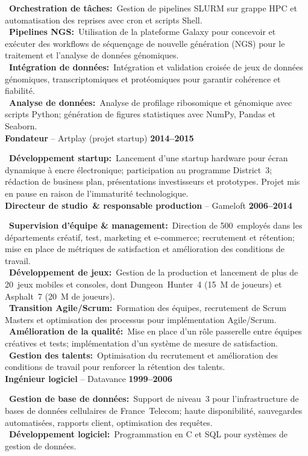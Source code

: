 \documentclass[a4paper,10pt]{article}
\newcommand{\resumeItem}[3]{%
  \noindent\textbf{#1} -- #2 \hfill \textbf{#3} \\
  \vspace{0.3em}
}
\newcommand{\jobItem}[2]{%
  \noindent
  \textbullet\ \textbf{#1\ifthenelse{\boolean{EN}}{}{ }:}~#2\vspace{0.3em} \\
}
\begin{document}
{{    \jobItem{Orchestration de tâches}{Gestion de pipelines SLURM sur grappe HPC et automatisation des reprises avec cron et scripts Shell.}
    \jobItem{Pipelines NGS}{Utilisation de la plateforme Galaxy pour concevoir et exécuter des workflows de séquençage de nouvelle génération (NGS) pour le traitement et l’analyse de données génomiques.}
    \jobItem{Intégration de données}{Intégration et validation croisée de jeux de données génomiques, transcriptomiques et protéomiques pour garantir cohérence et fiabilité.}
    \jobItem{Analyse de données}{Analyse de profilage ribosomique et génomique avec scripts Python; génération de figures statistiques avec NumPy, Pandas et Seaborn.}
    \vspace{1em}
    \resumeItem{Fondateur}{Artplay (projet startup)}{2014–2015}
    \jobItem{Développement startup}{Lancement d'une startup hardware pour écran dynamique à encre électronique; participation au programme District 3; rédaction de business plan, présentations investisseurs et prototypes. Projet mis en pause en raison de l'immaturité technologique.}
    \vspace{1em}
    \resumeItem{Directeur de studio \& responsable production}{Gameloft}{2006–2014}
    \jobItem{Supervision d'équipe \& management}{Direction de 500 employés dans les départements créatif, test, marketing et e-commerce; recrutement et rétention; mise en place de métriques de satisfaction et amélioration des conditions de travail.}
    \jobItem{Développement de jeux}{Gestion de la production et lancement de plus de 20 jeux mobiles et consoles, dont Dungeon Hunter 4 (15 M de joueurs) et Asphalt 7 (20 M de joueurs).}
    \jobItem{Transition Agile/Scrum}{Formation des équipes, recrutement de Scrum Masters et optimisation des processus pour implémentation Agile/Scrum.}
    \jobItem{Amélioration de la qualité}{Mise en place d'un rôle passerelle entre équipes créatives et tests; implémentation d'un système de mesure de satisfaction.}
    \jobItem{Gestion des talents}{Optimisation du recrutement et amélioration des conditions de travail pour renforcer la rétention des talents.}
    \vspace{1em}
    \resumeItem{Ingénieur logiciel}{Datavance}{1999–2006}
    \jobItem{Gestion de base de données}{Support de niveau 3 pour l'infrastructure de bases de données cellulaires de France Telecom; haute disponibilité, sauvegardes automatisées, rapports client, optimisation des requêtes.}
    \jobItem{Développement logiciel}{Programmation en C et SQL pour systèmes de gestion de données.}
  }
}
\end{document}
